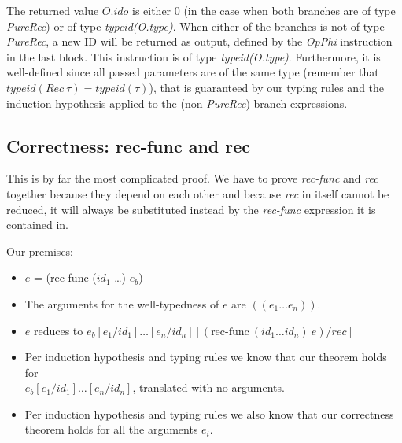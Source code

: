\documentclass[letterpaper,12pt]{article}
\begin{document}
The returned value $O.ido$ is either $0$ (in the case
when both branches are of type \textit{PureRec}) or of type \textit{typeid(O.type)}.
When either of the branches is not of type \textit{PureRec}, a new
ID will be returned as output, defined by the \textit{OpPhi} instruction
in the last block. This instruction is of type \textit{typeid(O.type)}.
Furthermore, it is well-defined since all passed parameters are
of the same type (remember that $typeid(Rec\: \tau) = typeid(\tau)$),
that is guaranteed by our typing rules and the induction hypothesis
applied to the (non-\textit{PureRec}) branch expressions.

\subsection{Correctness: rec-func and rec}

This is by far the most complicated proof. We have to prove \textit{rec-func}
and \textit{rec} together because they depend on each other and because
\textit{rec} in itself cannot be reduced, it will always be substituted
instead by the \textit{rec-func} expression it is contained in.

Our premises:
\begin{itemize}
	\item $e$ = (rec-func ($id_1$ \dots) $e_b$)
	\item The arguments for the well-typedness of $e$ are $((e_1 \dots e_n))$.
	\item $e$ reduces to 
		$e_b[e_1 / id_1]\dots[e_n / id_n][(\text{rec-func}\:(id_1 \dots id_n)\:e) / rec]$
	\item Per induction hypothesis and typing rules we know that our theorem
		holds for \\
		$e_b[e_1 / id_1]\dots[e_n / id_n]$, translated with no arguments.
	\item Per induction hypothesis and typing rules we also know that our correctness theorem
		holds for all the arguments $e_i$.
\end{itemize}
\end{document}

